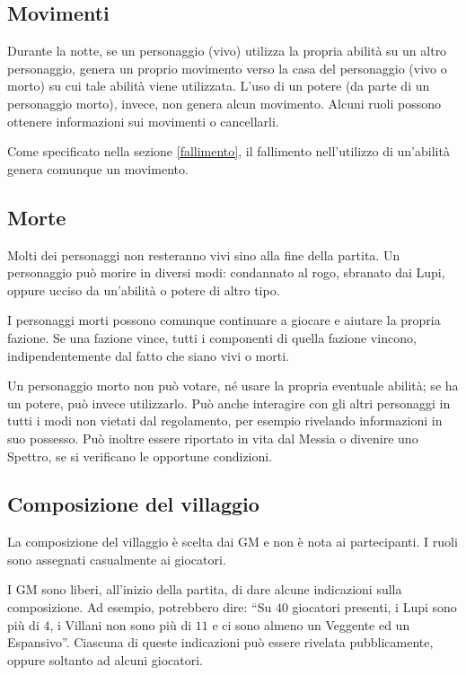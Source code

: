 \documentclass[a4paper,10pt]{article}
\begin{document}

\subsection{Movimenti}

Durante la notte, se un personaggio (vivo) utilizza la propria abilità su un altro personaggio, genera un proprio movimento verso la casa del personaggio (vivo o morto) su cui tale abilità viene utilizzata. L'uso di un potere (da parte di un personaggio morto), invece, non genera alcun movimento. Alcuni ruoli possono ottenere informazioni sui movimenti o cancellarli.

Come specificato nella sezione \ref{fallimento}, il fallimento nell'utilizzo di un'abilità genera comunque un movimento.

\subsection{Morte}

Molti dei personaggi non resteranno vivi sino alla fine della partita. Un personaggio può morire in diversi modi: condannato al rogo, sbranato dai Lupi, oppure ucciso da un'abilità o potere di altro tipo.

I personaggi morti possono comunque continuare a giocare e aiutare la propria fazione. Se una fazione vince, tutti i componenti di quella fazione vincono, indipendentemente dal fatto che siano vivi o morti.

Un personaggio morto non può votare, né usare la propria eventuale abilità; se ha un potere, può invece utilizzarlo. Può anche interagire con gli altri personaggi in tutti i modi non vietati dal regolamento, per esempio rivelando informazioni in suo possesso. Può inoltre essere riportato in vita dal Messia o divenire uno Spettro, se si verificano le opportune condizioni.


\subsection{Composizione del villaggio}

La composizione del villaggio è scelta dai GM e non è nota ai partecipanti. I ruoli sono assegnati casualmente ai giocatori.

I GM sono liberi, all'inizio della partita, di dare alcune indicazioni sulla composizione. Ad esempio, potrebbero dire: ``Su $40$ giocatori presenti, i Lupi sono più di $4$, i Villani non sono più di $11$ e ci sono almeno un Veggente ed un Espansivo''. Ciascuna di queste indicazioni può essere rivelata pubblicamente, oppure soltanto ad alcuni giocatori.
\end{document}
